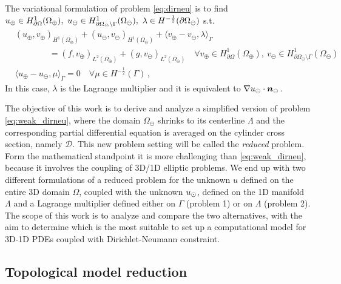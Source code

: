 \documentclass[r]{siamart171218}
\begin{document}
The variational formulation of problem \eqref{eq:dirneu}
is to find $u_{\oplus} \in H^1_{\partial\Omega}(\Omega_\oplus), \ u_{\ominus} \in H^1_{\partial\Omega_\ominus\setminus\Gamma}(\Omega_\ominus), \ \lambda \in H^{-\frac12}(\partial\Omega_\ominus)$ s.t.
\begin{subequations}\label{eq:weak_dirneu}
\begin{align}
&(u_\oplus,v_\oplus)_{H^1(\Omega_\oplus)} + (u_\ominus,v_\ominus)_{H^1(\Omega_\ominus)} 
+ \langle  v_\oplus - v_\ominus, \lambda \rangle_{\Gamma} 
\\
\nonumber
&\qquad\qquad = (f,v_\oplus)_{L^2(\Omega_\oplus)} + (g,v_\ominus)_{L^2(\Omega_\ominus)}
\quad \forall v_\oplus \in H^1_{\partial\Omega}(\Omega_\oplus), \ v_\ominus \in H^1_{\partial\Omega_\ominus\setminus\Gamma}(\Omega_\ominus)
\\
& \langle u_\oplus - u_\ominus, \mu \rangle_{\Gamma} = 0
\quad \forall  \mu \in H^{-\frac12}(\Gamma)\,,
\end{align}
\end{subequations}
In this case, $\lambda$ is the Lagrange multiplier and it is equivalent to $\nabla u_{\ominus} \cdot \boldsymbol n_\ominus$.

The objective of this work is to derive and analyze a simplified version of problem \eqref{eq:weak_dirneu}, where the domain $\Omega_\ominus$ shrinks to its centerline $\Lambda$ and the corresponding partial differential equation is averaged on the cylinder cross section, namely $\mathcal{D}$. This new problem setting will be called the \emph{reduced} problem. Form the mathematical standpoint it is more challenging than \eqref{eq:weak_dirneu}, because it involves the coupling of 3D/1D elliptic problems.
We end up with two different formulations of a reduced problem for the unknown $u$ defined on the entire 3D domain $\Omega$, 
coupled with the unknown $u_{\odot}$, defined on the 1D manifold $\Lambda$ and a Lagrange multiplier defined either on $\Gamma$ (problem 1) or on $\Lambda$ (problem 2). 
The scope of this work is to analyze and compare the two alternatives,
with the aim to determine which is the most suitable to set up a computational model for 3D-1D PDEs coupled with Dirichlet-Neumann constraint.

\subsection{Topological model reduction}
\end{document}
